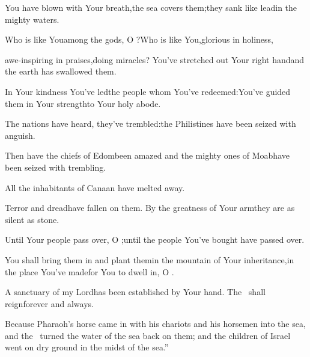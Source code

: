 \begin{inparaenum}
  \pa{} You have blown with Your breath,\pa{}the sea covers them;\pa{}they sank like lead\pa{}in the mighty waters.%

  \pa{} Who is like You\pa{}among the gods, O \lord?\pa{}Who is like You,\pa{}glorious in holiness,%

  \pb{}awe-inspiring in praises,\pa{}doing miracles?%
  \pa{} You've stretched out Your right hand\pa{}and the earth has swallowed them.%

  \pa{} In Your kindness You've led\pa{}the people whom You've redeemed:\pa{}You've guided them%
  in Your strength\pa{}to Your holy abode.%

  \pa{} The nations%
  have heard, they've trembled:\pa{}the Philistines have been seized with anguish.%

  \pa{} Then have the chiefs of Edom\pa{}been amazed%
  \pa{}and the mighty ones of Moab\pa{}have been seized with trembling.%

  \pb{}All the inhabitants of Canaan have melted away.%

  \pa{} Terror and dread\pa{}have fallen on them.%
  \pa{}By the greatness of Your arm\pa{}they are as silent as stone.%

  \pb{}Until Your people pass over, O \lord;\pa{}until the people You've bought have passed over.%

  \pa{} You shall bring them in and plant them\pa{}in the mountain of Your inheritance,\pa{}in the place You've made\pa{}for You to dwell in, O \lord.%

  \pb{}A sanctuary of my Lord\pa{}has been established by Your hand.\pa{} The \lord\ shall reign\pa{}forever and always.%

   Because Pharaoh's horse came in with his chariots and his horsemen into the sea, and the \lord\ turned the water of the sea back on them; and the children of Israel went on dry ground in the midst of the sea.''%


\end{inparaenum}
